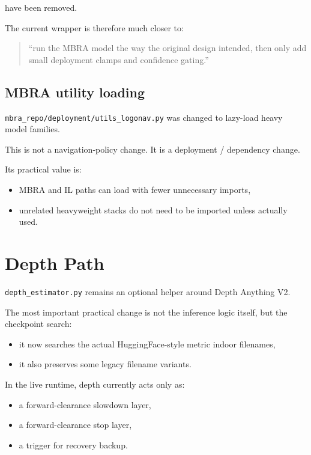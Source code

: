 \documentclass[11pt,a4paper]{article}
\begin{document}
have been removed.

The current wrapper is therefore much closer to:

\begin{quote}
``run the MBRA model the way the original design intended, then only add small
deployment clamps and confidence gating.''
\end{quote}

\subsection{MBRA utility loading}

\texttt{mbra\_repo/deployment/utils\_logonav.py} was changed to lazy-load heavy
model families.

This is not a navigation-policy change. It is a deployment / dependency change.

Its practical value is:

\begin{itemize}[nosep]
  \item MBRA and IL paths can load with fewer unnecessary imports,
  \item unrelated heavyweight stacks do not need to be imported unless actually used.
\end{itemize}


\section{Depth Path}

\texttt{depth\_estimator.py} remains an optional helper around Depth Anything V2.

The most important practical change is not the inference logic itself, but the
checkpoint search:

\begin{itemize}[nosep]
  \item it now searches the actual HuggingFace-style metric indoor filenames,
  \item it also preserves some legacy filename variants.
\end{itemize}

In the live runtime, depth currently acts only as:

\begin{itemize}[nosep]
  \item a forward-clearance slowdown layer,
  \item a forward-clearance stop layer,
  \item a trigger for recovery backup.
\end{itemize}
\end{document}
